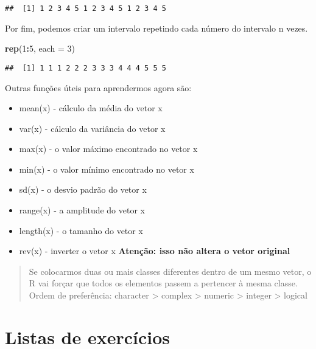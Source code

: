 \documentclass[]{book}
\newenvironment{Shaded}{\begin{snugshade}}{\end{snugshade}}
\newcommand{\DataTypeTok}[1]{\textcolor[rgb]{0.13,0.29,0.53}{#1}}
\newcommand{\DecValTok}[1]{\textcolor[rgb]{0.00,0.00,0.81}{#1}}
\newcommand{\KeywordTok}[1]{\textcolor[rgb]{0.13,0.29,0.53}{\textbf{#1}}}
\newcommand{\NormalTok}[1]{#1}
\newcommand{\OperatorTok}[1]{\textcolor[rgb]{0.81,0.36,0.00}{\textbf{#1}}}
\providecommand{\tightlist}{%
  \setlength{\itemsep}{0pt}\setlength{\parskip}{0pt}}
\theoremstyle{definition}
\theoremstyle{definition}
\theoremstyle{definition}
\theoremstyle{remark}
\begin{document}
\begin{verbatim}
##  [1] 1 2 3 4 5 1 2 3 4 5 1 2 3 4 5
\end{verbatim}

Por fim, podemos criar um intervalo repetindo cada número do intervalo n vezes.

\begin{Shaded}
\begin{Highlighting}[]
\KeywordTok{rep}\NormalTok{(}\DecValTok{1}\OperatorTok{:}\DecValTok{5}\NormalTok{, }\DataTypeTok{each =} \DecValTok{3}\NormalTok{)}
\end{Highlighting}
\end{Shaded}

\begin{verbatim}
##  [1] 1 1 1 2 2 2 3 3 3 4 4 4 5 5 5
\end{verbatim}

Outras funções úteis para aprendermos agora são:

\begin{itemize}
\tightlist
\item
  mean(x) - cálculo da média do vetor x
\item
  var(x) - cálculo da variância do vetor x
\item
  max(x) - o valor máximo encontrado no vetor x
\item
  min(x) - o valor mínimo encontrado no vetor x
\item
  sd(x) - o desvio padrão do vetor x
\item
  range(x) - a amplitude do vetor x
\item
  length(x) - o tamanho do vetor x
\item
  rev(x) - inverter o vetor x \textbf{Atenção: isso não altera o vetor original}
\end{itemize}

\begin{quote}
Se colocarmos duas ou mais classes diferentes dentro de um mesmo vetor, o R vai forçar que todos os elementos passem a pertencer à mesma classe. Ordem de preferência: character \textgreater{} complex \textgreater{} numeric \textgreater{} integer \textgreater{} logical
\end{quote}

\hypertarget{listas-de-exercuxedcios}{%
\section{Listas de exercícios}\label{listas-de-exercuxedcios}}
\end{document}
